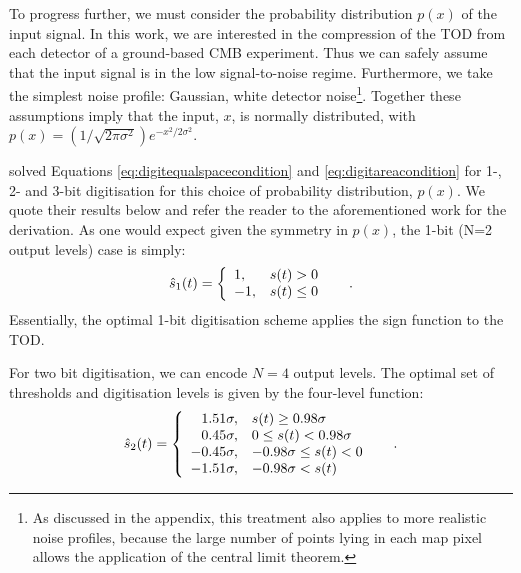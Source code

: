 \documentclass[a4paper,fleqn,usenatbib]{mnras}
\begin{document}
To progress further, we must consider the probability distribution $p(x)$ of the input signal. 
In this work, we are interested in the compression of the TOD from each detector of a ground-based CMB experiment. 
Thus we can safely assume that the input signal is in the low signal-to-noise regime. 
Furthermore, we take the simplest noise profile: Gaussian, white detector noise\footnote{As discussed in the appendix, this treatment also applies to more realistic noise profiles, because the large number of points lying in each map pixel allows the application of the central limit theorem.}. 
Together these assumptions imply that the input, $x$, is normally distributed, with $p(x) = (1/\sqrt{2\pi\sigma^2}) e^{-x^2/2\sigma^2}$. 

\citet{max1960} solved Equations \ref{eq:digitequalspacecondition} and \ref{eq:digitareacondition} for 1-, 2- and 3-bit digitisation for this choice of probability distribution, $p(x)$. 
We quote their results below and refer the reader to the aforementioned work for the derivation.  
As one would expect given the symmetry in $p(x)$, the 1-bit (N=2 output levels) case is simply:
\begin{equation} \label{eq:1bit}
\hat{s}_1(t) = \left\{ \begin{array}{lr}
1, & s(t) > 0\\
-1, & s(t) \leq 0
\end{array} \right. \hspace{0.5cm}.  \end{equation}
Essentially, the optimal 1-bit digitisation scheme applies the sign function to the TOD. 

For two bit digitisation, we can encode $N=4$ output levels. The optimal set of thresholds and digitisation levels is given by the four-level function:
\begin{equation}  \label{eq:2bit}
\hat{s}_2(t) = \left\{ \begin{array}{rl}
1.51 \sigma, & s(t) \geq 0.98 \sigma\\
0.45 \sigma, & 0 \leq s(t) < 0.98 \sigma\\
-0.45 \sigma, & -0.98 \sigma \leq s(t) < 0\\
-1.51 \sigma, & -0.98 \sigma < s(t)\\
\end{array} \right. \hspace{0.5cm}.  \end{equation}
\end{document}
